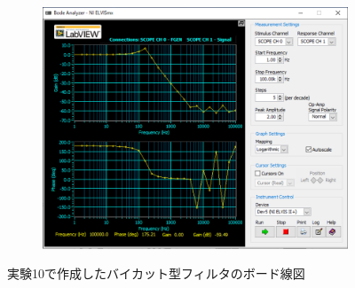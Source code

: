 \begin{figure}
	\centering
	\begin{subfigure}{0.8\linewidth}
		\addtocounter{subfigure}{4}
		\centering
		\includegraphics[width=0.8\linewidth]{src/figures/exp10/20k-band-bode.png}
		\label{fig:exp10-20k-band-bode}
	\end{subfigure}
	\caption{実験10で作成したバイカット型フィルタのボード線図}\label{fig:exp10-bode}
\end{figure}
